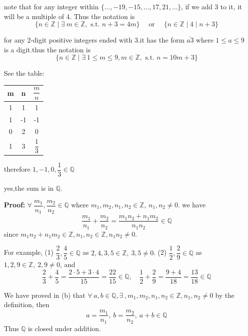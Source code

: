 \documentclass[11pt]{homework}
\newcommand{\Z}{\mathbb{Z}}
\newcommand{\Q}{\mathbb{Q}}
\newcommand{\est}{\exists\ }
\newcommand{\fal}{\forall\ }
\newcommand{\st}{\text{ s.t. }}
\newcommand{\tor}{\text{ or }}
\begin{document}
\maketitle

\setcounter{questionCounter}{1}

\question
\begin{alphaparts}

    \questionpart note that for any integer within $\{\dots, -19, -15,\dots, 17, 21, \dots\}$, if we add $3$ to it, it will be a multiple of 4. Thus the notation is
    \[\{n\in \Z\mid\est m \in \Z ,\st n+3=4m\}\quad\tor\quad \{n\in \Z\mid 4 \mid n+3\}\]

    \questionpart for any 2-digit positive integers ended with 3.it has the form $\bar{a3}$ where $1\leq a \leq 9$ is a digit.thus the notation is
    \[\{n\in \Z\mid \est 1 \leqslant m\leqslant 9, m\in \Z, \st n=10m+3\}\]

\end{alphaparts}

\question
\begin{alphaparts}
    \questionpart See the table:\\
    \begin{center}
        \begin{tabular}{ccc}
            \toprule
            m & n  & $\dfrac{m}{n}$ \\[4pt]
            \hline
            1 & 1  & 1              \\
            1 & -1 & -1             \\
            0 & 2  & 0              \\
            1 & 3  & $\dfrac{1}{3}$ \\
            \bottomrule
        \end{tabular}
    \end{center}
    therefore $1,-1,0,\dfrac{1}{3}\in \Q$

    \questionpart yes,the sum is in $\Q$. \par
    \textbf{Proof:} $\fal \dfrac{m_1}{n_1},\dfrac{m_2}{n_2}\in \Q$ where $m_1,m_2,n_1,n_2\in \Z,\ n_1,n_2 \neq 0. $	we have
    \[\dfrac{m_1}{n_1}+\dfrac{m_2}{n_2}=\dfrac{m_1 n_2+n_1 m_2}{n_1 n_2}\in \Q\] since $m_1 n_2+n_1m_2\in \Z, n_1,n_2\in \Z, n_1 n_2 \neq 0$. \par
    For example, (1) $\dfrac{2}{3},\dfrac{4}{5}\in \Q$ as $2,4,3,5\in \Z,\ 3,5\neq 0$. (2) $\dfrac{1}{2},\dfrac{2}{9}\in \Q$ as $1,2,9\in \Z,\ 2,9\neq 0$, and
    \[\dfrac{2}{3}+\dfrac{4}{5}=\dfrac{2\cdot5+3\cdot4}{15}=\dfrac{22}{15}\in \Q,\quad\dfrac{1}{2}+\dfrac{2}{9}=\dfrac{9+4}{18}=\dfrac{13}{18}\in \Q\]

    \questionpart We have proved in (b) that $\fal a,b\in \Q, \est,m_1,m_2,n_1,n_2\in \Z,n_1,n_2\neq 0$ by the definition, then
    \[a=\dfrac{m_1}{n_1},\ b=\dfrac{m_2}{n_2},\ a+b \in \Q\]
    Thus $\Q$ is closed under addition.
\end{alphaparts}
\end{document}
